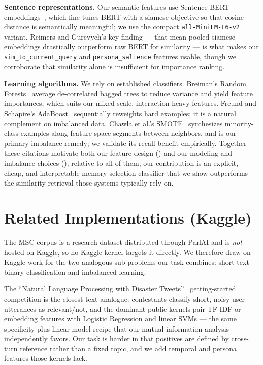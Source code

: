 \documentclass[11pt]{article}
\begin{document}
\textbf{Sentence representations.} Our semantic features use Sentence-BERT
embeddings~\cite{sbert}, which fine-tunes BERT with a siamese objective so that
cosine distance is semantically meaningful; we use the compact
\texttt{all-MiniLM-L6-v2} variant. Reimers and Gurevych's key finding --- that
mean-pooled siamese embeddings drastically outperform raw BERT for similarity ---
is what makes our \texttt{sim\_to\_current\_query} and \texttt{persona\_salience}
features usable, though we corroborate that similarity alone is insufficient for
importance ranking.

\textbf{Learning algorithms.} We rely on established classifiers. Breiman's Random
Forests~\cite{rf} average de-correlated bagged trees to reduce variance and yield
feature importances, which suits our mixed-scale, interaction-heavy features.
Freund and Schapire's AdaBoost~\cite{adaboost} sequentially reweights hard
examples; it is a natural complement on imbalanced data. Chawla et al.'s
SMOTE~\cite{smote} synthesizes minority-class examples along feature-space
segments between neighbors, and is our primary imbalance remedy; we validate its
recall benefit empirically. Together these citations motivate both our feature
design (\cite{msc,sbert,memorybank}) and our modeling and imbalance choices
(\cite{rf,adaboost,smote}); relative to all of them, our contribution is an
explicit, cheap, and interpretable memory-selection classifier that we show
outperforms the similarity retrieval those systems typically rely on.

\section{Related Implementations (Kaggle)}
The MSC corpus is a research dataset distributed through ParlAI and is
\emph{not} hosted on Kaggle, so no Kaggle kernel targets it directly. We
therefore draw on Kaggle work for the two analogous sub-problems our task
combines: short-text binary classification and imbalanced learning.

The ``Natural Language Processing with Disaster
Tweets''~\cite{kaggle_disaster} getting-started competition is the closest text
analogue: contestants classify short, noisy user utterances as relevant/not, and
the dominant public kernels pair TF-IDF or embedding features with Logistic
Regression and linear SVMs --- the same specificity-plus-linear-model recipe that
our mutual-information analysis independently favors. Our task is harder in that
positives are defined by cross-turn reference rather than a fixed topic, and we add
temporal and persona features those kernels lack.
\end{document}
